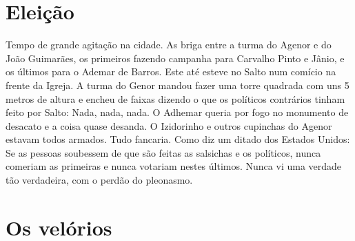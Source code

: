 \documentclass[12pt,brazil,]{book}
\begin{document}
\section{Eleição}\label{eleiuxe7uxe3o}

Tempo de grande agitação na cidade. As briga entre a turma do Agenor e
do João Guimarães, os primeiros fazendo campanha para Carvalho Pinto e
Jânio, e os últimos para o Ademar de Barros. Este até esteve no Salto
num comício na frente da Igreja. A turma do Genor mandou fazer uma torre
quadrada com uns 5 metros de altura e encheu de faixas dizendo o que os
políticos contrários tinham feito por Salto: Nada, nada, nada. O Adhemar
queria por fogo no monumento de desacato e a coisa quase desanda. O
Izidorinho e outros cupinchas do Agenor estavam todos armados. Tudo
fancaria. Como diz um ditado dos Estados Unidos: Se as pessoas soubessem
de que são feitas as salsichas e os políticos, nunca comeriam as
primeiras e nunca votariam nestes últimos. Nunca vi uma verdade tão
verdadeira, com o perdão do pleonasmo.

\section{Os velórios}\label{os-veluxf3rios}
\end{document}
